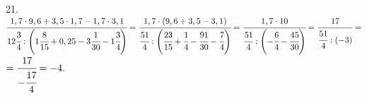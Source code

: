 21. $\cfrac{1,7\cdot9,6+3,5\cdot1,7-1,7\cdot 3,1}{12\cfrac{3}{4}:\left(1\cfrac{8}{15}+0,25-3\cfrac{1}{30}-1\cfrac{3}{4}\right)}=
\cfrac{1,7\cdot(9,6+3,5-3,1)}{\cfrac{51}{4}:\left(\cfrac{23}{15}+\cfrac{1}{4}-\cfrac{91}{30}-\cfrac{7}{4}\right)}=
\cfrac{1,7\cdot10}{\cfrac{51}{4}:\left(-\cfrac{6}{4}-\cfrac{45}{30}\right)}=\cfrac{17}{\cfrac{51}{4}:\left(-3\right)}=$\\$=\cfrac{17}{-\cfrac{17}{4}}=-4.$\\
